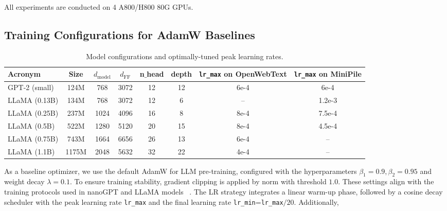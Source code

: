 All experiments are conducted on 4 A800/H800 80G GPUs.%



\subsection{Training Configurations for AdamW Baselines}
\label{appendix: experiments for baselines}

\begin{table}[!ht]
		\centering
        \renewcommand{\arraystretch}{1.25}
		\caption{\small Model configurations and optimally-tuned peak learning rates.}
		\label{table: model config and max lrs}
		\begin{small}
		\begin{tabular}{l|c|c|c|c|c|c|c}
		\hline 
		Acronym & Size & $d_{\mathrm{model}}$ & $d_{\mathrm{FF}}$ & n$\_$head & depth &  \texttt{lr\_max} on OpenWebText & \texttt{lr\_max} on MiniPile \\
		\hline\hline 
        GPT-2 (small) & 124M & 768 & 3072 & 12 & 12 & 6e-4 & 6e-4 \\
	LLaMA (0.13B) & 134M &  768 & 3072 & 12 & 6 & -- & 1.2e-3 \\
	LLaMA (0.25B) & 237M & 1024 & 4096 & 16 & 8 & 8e-4 & 7.5e-4 \\
	LLaMA (0.5B) & 522M & 1280 & 5120 & 20 & 15 & 8e-4 & 4.5e-4 \\
	LLaMA (0.75B) & 743M & 1664 & 6656 & 26 & 13 & 6e-4 & -- \\
	LLaMA (1.1B) & 1175M & 2048 & 5632 & 32 & 22 & 4e-4 & -- \\ 
	 \hline 
		\end{tabular}
		\end{small}
\end{table}

As a baseline optimizer, we use the default AdamW for LLM pre-training, configured with the hyperparameters $\beta_1=0.9,\beta_2=0.95$ and weight decay $\lambda=0.1$. To ensure training stability, gradient clipping is applied by norm with threshold $1.0$. These settings align with the training protocols used in nanoGPT and LLaMA models ~\citep{touvron2023LLaMA}.
The LR strategy integrates a linear warm-up
phase, followed by a cosine decay scheduler with the peak learning rate \texttt{lr\_max} and the final learning rate \texttt{lr\_min}=\texttt{lr\_max}$/20$. Additionally,

